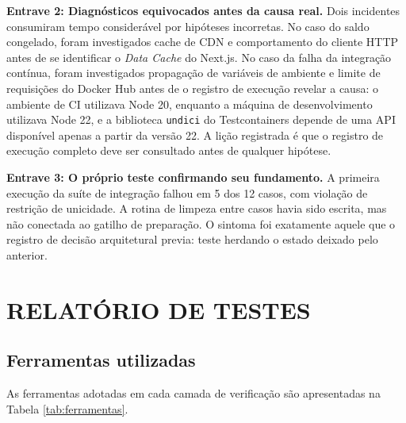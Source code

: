\documentclass[12pt,a4paper]{article}
\begin{document}
\textbf{Entrave 2: Diagnósticos equivocados antes da causa real.} Dois incidentes consumiram tempo considerável por hipóteses incorretas. No caso do saldo congelado, foram investigados cache de CDN e comportamento do cliente HTTP antes de se identificar o \textit{Data Cache} do Next.js. No caso da falha da integração contínua, foram investigados propagação de variáveis de ambiente e limite de requisições do Docker Hub antes de o registro de execução revelar a causa: o ambiente de CI utilizava Node 20, enquanto a máquina de desenvolvimento utilizava Node 22, e a biblioteca \texttt{undici} do Testcontainers depende de uma API disponível apenas a partir da versão 22. A lição registrada é que o registro de execução completo deve ser consultado antes de qualquer hipótese.

\textbf{Entrave 3: O próprio teste confirmando seu fundamento.} A primeira execução da suíte de integração falhou em 5 dos 12 casos, com violação de restrição de unicidade. A rotina de limpeza entre casos havia sido escrita, mas não conectada ao gatilho de preparação. O sintoma foi exatamente aquele que o registro de decisão arquitetural previa: teste herdando o estado deixado pelo anterior.

\section{RELATÓRIO DE TESTES}

\subsection{Ferramentas utilizadas}

As ferramentas adotadas em cada camada de verificação são apresentadas na Tabela \ref{tab:ferramentas}.
\end{document}
